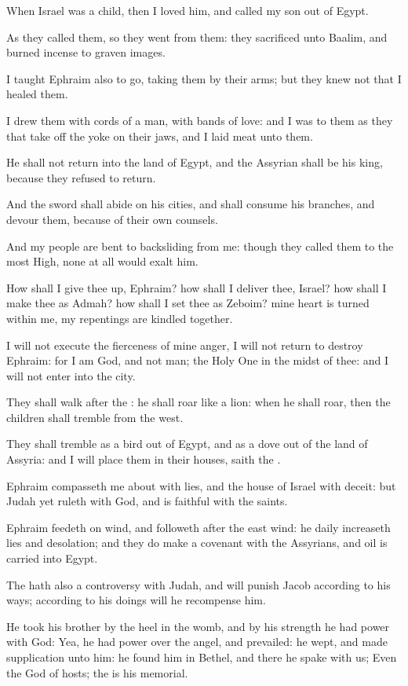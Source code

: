 \Chapter
\Verse When Israel was a child, then I loved him, and called my son out of Egypt.

\Verse As they called them, so they went from them: they sacrificed unto Baalim, and burned incense to graven images.

\Verse I taught Ephraim also to go, taking them by their arms; but they knew not that I healed them.

\Verse I drew them with cords of a man, with bands of love: and I was to them as they that take off the yoke on their jaws, and I laid meat unto them.

\Verse He shall not return into the land of Egypt, and the Assyrian shall be his king, because they refused to return.

\Verse And the sword shall abide on his cities, and shall consume his branches, and devour them, because of their own counsels.

\Verse And my people are bent to backsliding from me: though they called them to the most High, none at all would exalt him.

\Verse How shall I give thee up, Ephraim? how shall I deliver thee, Israel?  how shall I make thee as Admah? how shall I set thee as Zeboim? mine heart is turned within me, my repentings are kindled together.

\Verse I will not execute the fierceness of mine anger, I will not return to destroy Ephraim: for I am God, and not man; the Holy One in the midst of thee: and I will not enter into the city.

\Verse They shall walk after the \LORD: he shall roar like a lion: when he shall roar, then the children shall tremble from the west.

\Verse They shall tremble as a bird out of Egypt, and as a dove out of the land of Assyria: and I will place them in their houses, saith the \LORD.

\Verse Ephraim compasseth me about with lies, and the house of Israel with deceit: but Judah yet ruleth with God, and is faithful with the saints.


\Chapter
\Verse Ephraim feedeth on wind, and followeth after the east wind: he daily increaseth lies and desolation; and they do make a covenant with the Assyrians, and oil is carried into Egypt.

\Verse The \LORD hath also a controversy with Judah, and will punish Jacob according to his ways; according to his doings will he recompense him.

\Verse He took his brother by the heel in the womb, and by his strength he had power with God: \Verse Yea, he had power over the angel, and prevailed: he wept, and made supplication unto him: he found him in Bethel, and there he spake with us; \Verse Even the \LORD God of hosts; the \LORD is his memorial.


